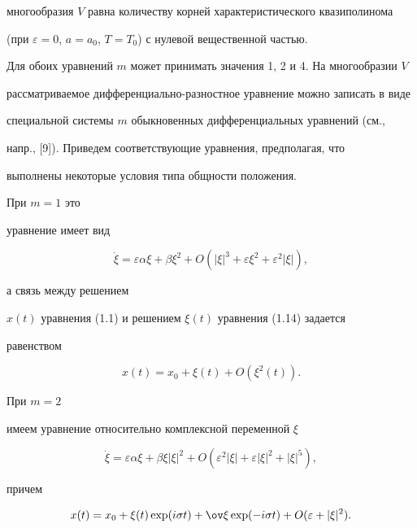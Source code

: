 многообразия $V$ равна количеству корней характеристического квазиполинома


(при $\varepsilon=0$, $ a=a_0$, $T=T_0$) с нулевой вещественной частью.


Для обоих уравнений $m$ может принимать значения 1, 2 и 4. На многообразии $V$


рассматриваемое дифференциально-разностное уравнение можно записать в виде


специальной системы $m$ обыкновенных дифференциальных уравнений (см.,


напр., [9]). Приведем соответствующие уравнения, предполагая, что


выполнены некоторые условия типа общности положения.





При $m=1$ это


уравнение имеет вид


\begin{equation}


\Dot\xi = \varepsilon\alpha\xi + \beta\xi^2 +


O(|\xi|^3+\varepsilon\xi^2+\varepsilon^2|\xi|),


\end{equation}


а связь между решением


$x(t)$ уравнения (1.1) и решением $\xi(t)$ уравнения (1.14) задается


равенством


\begin{equation}


x(t) = x_0 + \xi(t) + O(\xi^2(t)).


\end{equation}


При $m=2$


имеем уравнение относительно комплексной переменной $\xi$


\begin{equation}


\Dot\xi =


\varepsilon\alpha\xi + \beta\xi|\xi|^2 +


O(\varepsilon^2|\xi|+\varepsilon|\xi|^2+|\xi|^5),


\end{equation}


причем


\begin{equation}


x(t) = x_0 + \xi(t)\exp(i\sigma t)+ \ov\xi\exp(-i\sigma t) +


O(\varepsilon+|\xi|^2).


\end{equation}


